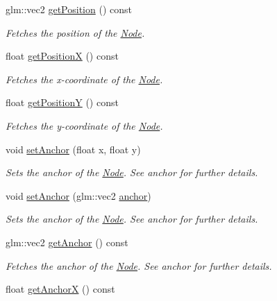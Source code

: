 \begin{DoxyCompactItemize}
glm\+::vec2 \mbox{\hyperlink{classsage_1_1Node_a67eb5862f4da3cc4b2219a7e555a5678}{get\+Position}} () const
\begin{DoxyCompactList}\small\item\em Fetches the position of the \mbox{\hyperlink{classsage_1_1Node}{Node}}. \end{DoxyCompactList}\item 
float \mbox{\hyperlink{classsage_1_1Node_a17e92da5beaeb4b299c4e93729a22b1a}{get\+PositionX}} () const
\begin{DoxyCompactList}\small\item\em Fetches the x-\/coordinate of the \mbox{\hyperlink{classsage_1_1Node}{Node}}. \end{DoxyCompactList}\item 
float \mbox{\hyperlink{classsage_1_1Node_a26337a40b7da400233451b71e85759cc}{get\+PositionY}} () const
\begin{DoxyCompactList}\small\item\em Fetches the y-\/coordinate of the \mbox{\hyperlink{classsage_1_1Node}{Node}}. \end{DoxyCompactList}\item 
void \mbox{\hyperlink{classsage_1_1Node_a8813a645a74f6ab59b25d434e65035c6}{set\+Anchor}} (float x, float y)
\begin{DoxyCompactList}\small\item\em Sets the anchor of the \mbox{\hyperlink{classsage_1_1Node}{Node}}. See anchor for further details. \end{DoxyCompactList}\item 
void \mbox{\hyperlink{classsage_1_1Node_a957a7e578660950b8518926239397ea0}{set\+Anchor}} (glm\+::vec2 \mbox{\hyperlink{classsage_1_1Node_a0956f07efec6dcbd3cf796a9028b9175}{anchor}})
\begin{DoxyCompactList}\small\item\em Sets the anchor of the \mbox{\hyperlink{classsage_1_1Node}{Node}}. See anchor for further details. \end{DoxyCompactList}\item 
glm\+::vec2 \mbox{\hyperlink{classsage_1_1Node_a6733949b7b281d78a8bef8beafe1b630}{get\+Anchor}} () const
\begin{DoxyCompactList}\small\item\em Fetches the anchor of the \mbox{\hyperlink{classsage_1_1Node}{Node}}. See anchor for further details. \end{DoxyCompactList}\item 
float \mbox{\hyperlink{classsage_1_1Node_aa5f31c33d60b32b618d3beaf4e5c6c51}{get\+AnchorX}} () const

\end{DoxyCompactItemize}
